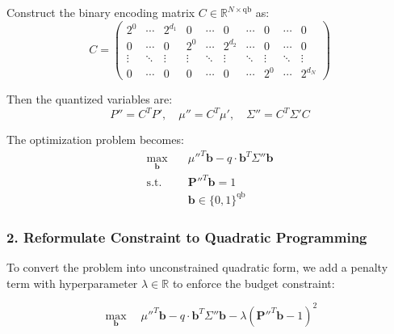 Construct the binary encoding matrix \( C \in \mathbb{R}^{N \times \text{qb}} \) as:
\begin{equation}
C = \left(
\begin{array}{cccccccccc}
2^0 & \cdots & 2^{d_1} & 0 & \cdots & 0 & \cdots & 0 & \cdots & 0 \\
0 & \cdots & 0 & 2^0 & \cdots & 2^{d_2} & \cdots & 0 & \cdots & 0 \\
\vdots & \ddots & \vdots & \vdots & \ddots & \vdots & \ddots & \vdots & \ddots & \vdots \\
0 & \cdots & 0 & 0 & \cdots & 0 & \cdots & 2^{0} & \cdots & 2^{d_N}
\end{array}
\right)
\end{equation}

Then the quantized variables are:
\begin{equation}
    P'' = C^T P', \quad \mu'' = C^T \mu', \quad \Sigma'' = C^T \Sigma' C
\end{equation}

The optimization problem becomes:
\begin{equation}
    \begin{aligned}
    \max_{\mathbf{b}} \quad & \mu''^T \mathbf{b} - q \cdot \mathbf{b}^T \Sigma'' \mathbf{b} \\
    \text{s.t.} \quad & \mathbf{P}''^T \mathbf{b} = 1 \\
    & \mathbf{b} \in \{0, 1\}^{\text{qb}}
    \end{aligned}
    \label{eq:binary_opt_problem}
\end{equation}



\subsubsection*{2. Reformulate Constraint to Quadratic Programming}

To convert the problem into unconstrained quadratic form, we add a penalty term with hyperparameter \( \lambda \in \mathbb{R} \) to enforce the budget constraint:

\begin{equation}
\max_{\mathbf{b}} \quad \mu''^T \mathbf{b} - q \cdot \mathbf{b}^T \Sigma'' \mathbf{b} - \lambda \left( \mathbf{P}''^T \mathbf{b} - 1 \right)^2
\label{eq:penalized_qp}
\end{equation}



